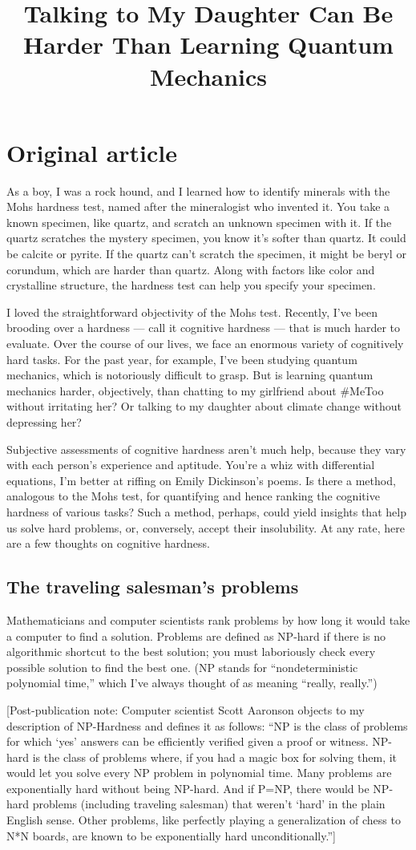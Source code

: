 \documentclass[a4paper]{article}
\title{Talking to My Daughter Can Be Harder Than Learning Quantum Mechanics}
\begin{document}

\section*{Original article}
As a boy, I was a rock hound, and I learned how to identify minerals with the Mohs hardness test, named after the mineralogist who invented it. You take a known specimen, like quartz, and scratch an unknown specimen with it. If the quartz scratches the mystery specimen, you know it’s softer than quartz. It could be calcite or pyrite. If the quartz can’t scratch the specimen, it might be beryl or corundum, which are harder than quartz. Along with factors like color and crystalline structure, the hardness test can help you specify your specimen.

I loved the straightforward objectivity of the Mohs test. Recently, I’ve been brooding over a hardness --- call it cognitive hardness --- that is much harder to evaluate. Over the course of our lives, we face an enormous variety of cognitively hard tasks. For the past year, for example, I’ve been studying quantum mechanics, which is notoriously difficult to grasp. But is learning quantum mechanics harder, objectively, than chatting to my girlfriend about \#MeToo without irritating her? Or talking to my daughter about climate change without depressing her?

Subjective assessments of cognitive hardness aren’t much help, because they vary with each person’s experience and aptitude. You’re a whiz with differential equations, I’m better at riffing on Emily Dickinson’s poems. Is there a method, analogous to the Mohs test, for quantifying and hence ranking the cognitive hardness of various tasks? Such a method, perhaps, could yield insights that help us solve hard problems, or, conversely, accept their insolubility. At any rate, here are a few thoughts on cognitive hardness.
\subsection*{The traveling salesman’s problems}
Mathematicians and computer scientists rank problems by how long it would take a computer to find a solution. Problems are defined as NP-hard if there is no algorithmic shortcut to the best solution; you must laboriously check every possible solution to find the best one. (NP stands for ``nondeterministic polynomial time,'' which I’ve always thought of as meaning ``really, really.'')

[Post-publication note: Computer scientist Scott Aaronson objects to my description of NP-Hardness and defines it as follows: “NP is the class of problems for which ‘yes’ answers can be efficiently verified given a proof or witness. NP-hard is the class of problems where, if you had a magic box for solving them, it would let you solve every NP problem in polynomial time. Many problems are exponentially hard without being NP-hard. And if P=NP, there would be NP-hard problems (including traveling salesman) that weren’t ‘hard’ in the plain English sense. Other problems, like perfectly playing a generalization of chess to N*N boards, are known to be exponentially hard unconditionally.”]
\end{document}
